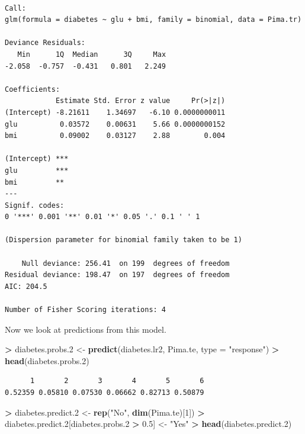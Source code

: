 \documentclass[]{krantz}
\makeatletter
\newenvironment{Shaded}{\begin{snugshade}}{\end{snugshade}}
\newcommand{\DataTypeTok}[1]{\textcolor[rgb]{0.27,0.27,0.27}{#1}}
\newcommand{\DecValTok}[1]{\textcolor[rgb]{0.06,0.06,0.06}{#1}}
\newcommand{\FloatTok}[1]{\textcolor[rgb]{0.06,0.06,0.06}{#1}}
\newcommand{\KeywordTok}[1]{\textcolor[rgb]{0.27,0.27,0.27}{\textbf{#1}}}
\newcommand{\NormalTok}[1]{#1}
\newcommand{\OperatorTok}[1]{\textcolor[rgb]{0.43,0.43,0.43}{\textbf{#1}}}
\newcommand{\StringTok}[1]{\textcolor[rgb]{0.5,0.5,0.5}{#1}}
\newenvironment{kframe}{%
\medskip{}
\setlength{\fboxsep}{.8em}
 \def\at@end@of@kframe{}%
 \ifinner\ifhmode%
  \def\at@end@of@kframe{\end{minipage}}%
  \begin{minipage}{\columnwidth}%
 \fi\fi%
 \def\FrameCommand##1{\hskip\@totalleftmargin \hskip-\fboxsep
 \colorbox{shadecolor}{##1}\hskip-\fboxsep
     \hskip-\linewidth \hskip-\@totalleftmargin \hskip\columnwidth}%
 \MakeFramed {\advance\hsize-\width
   \@totalleftmargin\z@ \linewidth\hsize
   \@setminipage}}%
 {\par\unskip\endMakeFramed%
 \at@end@of@kframe}
\renewenvironment{Shaded}{\begin{kframe}}{\end{kframe}}
\makeatother
\begin{document}
\begin{verbatim}

Call:
glm(formula = diabetes ~ glu + bmi, family = binomial, data = Pima.tr)

Deviance Residuals: 
   Min      1Q  Median      3Q     Max  
-2.058  -0.757  -0.431   0.801   2.249  

Coefficients:
            Estimate Std. Error z value     Pr(>|z|)
(Intercept) -8.21611    1.34697   -6.10 0.0000000011
glu          0.03572    0.00631    5.66 0.0000000152
bmi          0.09002    0.03127    2.88        0.004
               
(Intercept) ***
glu         ***
bmi         ** 
---
Signif. codes:  
0 '***' 0.001 '**' 0.01 '*' 0.05 '.' 0.1 ' ' 1

(Dispersion parameter for binomial family taken to be 1)

    Null deviance: 256.41  on 199  degrees of freedom
Residual deviance: 198.47  on 197  degrees of freedom
AIC: 204.5

Number of Fisher Scoring iterations: 4
\end{verbatim}

Now we look at predictions from this model.

\begin{Shaded}
\begin{Highlighting}[]
\OperatorTok{>}\StringTok{ }\NormalTok{diabetes.probs}\FloatTok{.2}\NormalTok{ <-}\StringTok{ }\KeywordTok{predict}\NormalTok{(diabetes.lr2, Pima.te, }\DataTypeTok{type =} \StringTok{"response"}\NormalTok{)}
\OperatorTok{>}\StringTok{ }\KeywordTok{head}\NormalTok{(diabetes.probs}\FloatTok{.2}\NormalTok{)}
\end{Highlighting}
\end{Shaded}

\begin{verbatim}
      1       2       3       4       5       6 
0.52359 0.05810 0.07530 0.06662 0.82713 0.50879 
\end{verbatim}

\begin{Shaded}
\begin{Highlighting}[]
\OperatorTok{>}\StringTok{ }\NormalTok{diabetes.predict}\FloatTok{.2}\NormalTok{ <-}\StringTok{ }\KeywordTok{rep}\NormalTok{(}\StringTok{"No"}\NormalTok{, }\KeywordTok{dim}\NormalTok{(Pima.te)[}\DecValTok{1}\NormalTok{])}
\OperatorTok{>}\StringTok{ }\NormalTok{diabetes.predict}\FloatTok{.2}\NormalTok{[diabetes.probs}\FloatTok{.2} \OperatorTok{>}\StringTok{ }\FloatTok{0.5}\NormalTok{] <-}\StringTok{ "Yes"}
\OperatorTok{>}\StringTok{ }\KeywordTok{head}\NormalTok{(diabetes.predict}\FloatTok{.2}\NormalTok{)}
\end{Highlighting}
\end{Shaded}
\end{document}
